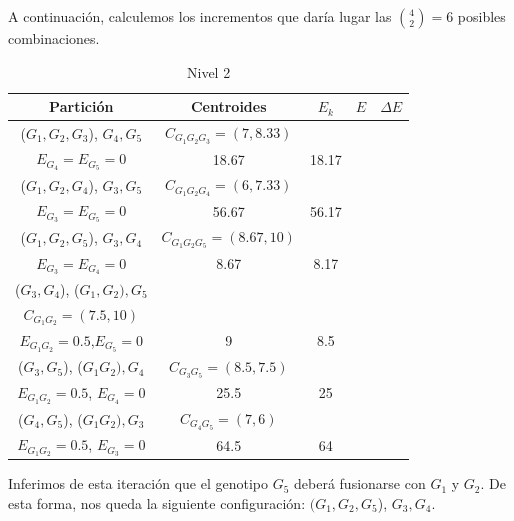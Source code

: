 \begin{ejemplo}
    A continuación, calculemos los incrementos que daría lugar las $\binom{4}{2} = 6$ posibles combinaciones.


    \begin{table}[h]
        \centering
        \begin{tabular}{|c|c|c|c|c|}
            \hline
            \textbf{Partición} & \textbf{Centroides} & \textbf{$E_k$} & \textbf{$E$} & \textbf{$\Delta E$} \\
            \hline
            ($G_{1},G_{2}, G_{3}$), $G_{4}, G_{5}$ & $C_{G_{1}G_{2}G_{3}} = (7, 8.33)$ & \makecell{$E_{G_{1}G_{2}G_{3}} = 18.67$ \\ $E_{G_{4}}=E_{G_{5}}=0$} & 18.67 & 18.17 \\
            \hline
            ($G_{1},G_{2}, G_{4}$), $G_{3}, G_{5}$ & $C_{G_{1}G_{2}G_{4}} = (6, 7.33)$ & \makecell{$E_{G_{1}G_{2}G_{4}} = 56.67$ \\ $E_{G_{3}}= E_{G_{5}}=0$} & 56.67 & 56.17 \\
            \hline
            ($G_{1},G_{2}, G_{5}$), $G_{3}, G_{4}$ & $C_{G_{1}G_{2}G_{5}} = (8.67, 10)$ & \makecell{$E_{G_{1}G_{2}G_{5}} = 8.67$ \\ $E_{G_{3}}= E_{G_{4}}=0$} & 8.67 & 8.17 \\
            \hline
            ($G_{3}, G_{4}$), ($G_{1},G_{2}), G_{5}$ & \makecell{$C_{G_{3}G_{4}} = (4.5, 3.5)$ \\ $C_{G_{1}G_{2}} = (7.5, 10)$} & \makecell{$E_{G_{3}G_{4}} = 9$ \\ $E_{G_{1}G_{2}} = 0.5$,$E_{G_{5}}=0$} & 9 & 8.5 \\  
            \hline
            ($G_{3}, G_{5}$), ($G_{1}G_{2}), G_{4}$ & $C_{G_{3}G_{5}} = (8.5, 7.5)$ & \makecell{$E_{G_{3}G_{5}}= 25$ \\ $E_{G_{1}G_{2}} = 0.5$, $E_{G_{4}}=0$} & 25.5 & 25 \\
            \hline
            ($G_{4}, G_{5}$), ($G_{1}G_{2}), G_{3}$ & $C_{G_{4}G_{5}} = (7, 6)$ & \makecell{$E_{G_{4}G_5} = 64$ \\ $E_{G_{1}G_{2}} = 0.5$, $E_{G_{3}}=0$} & 64.5 & 64 \\
            \hline
        \end{tabular}
        \caption{Nivel 2}
    \end{table}


    Inferimos de esta iteración que el genotipo $G_{5}$ deberá fusionarse con $G_{1}$ y $G_{2}$. De esta forma, nos queda la siguiente configuración: $(G_{1},G_{2}, G_{5}$), $G_{3}, G_{4}$. \newline


\end{ejemplo}
